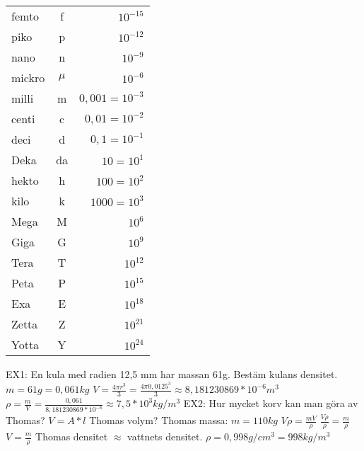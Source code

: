 \documentclass[a4paper,11pt]{article}
\begin{document}
\begin{flushleft}
\begin{tabular}{l c r}
  femto & f & $ 10^{-15} $\\ 
  piko & p & $ 10^{-12} $\\ 
  nano & n & $ 10^{-9} $\\ 
  mickro & $ \mu $ & $ 10^{-6} $\\ 
  milli & m & $ 0,001 = 10^{-3} $\\
  centi & c & $ 0,01 = 10^{-2} $\\
  deci & d & $ 0,1 = 10^{-1}$\\
  Deka & da & $ 10 = 10^1 $\\
  hekto & h & $ 100 = 10^2 $\\
  kilo & k & $ 1000 = 10^3 $\\
  Mega & M & $ 10^6 $\\
  Giga & G & $ 10^9 $\\
  Tera & T & $ 10^{12} $\\
  Peta & P & $ 10^{15} $\\
  Exa & E & $ 10^{18} $\\
  Zetta & Z & $ 10^{21} $\\
  Yotta & Y & $ 10^{24} $\\
\end{tabular}
\newpage
EX1:\newline
En kula med radien 12,5 mm har massan 61g.\newline
Bestäm kulans densitet.\newline
$ m = 61g = 0,061 kg $\newline
$ V = \frac{4\pi r^3}{3} = \frac{4\pi 0,0125^3}{3} \approx 8,181230869*10^{-6} m^3 $\newline
$ \rho = \frac{m}{V} = \frac{0,061}{8,181230869*10^{-6}} \approx 7,5*10^3 kg/m^3 $\newline
\newline
EX2:\newline
Hur mycket korv kan man göra av Thomas?\newline
$ V = A*l $\newline
Thomas volym?\newline
Thomas massa: $ m=110kg $\newline
$ V \rho = \frac{mV}{\rho} $\newline
$ \frac{V\rho}{\rho} = \frac{m}{\rho} $\newline
$ V = \frac{m}{\rho} $ \newline
Thomas densitet $ \approx $ vattnets densitet.\newline
$ \rho = 0,998 g/cm^3 = 998 kg/m^3 $\newline

\end{flushleft}
\end{document}
